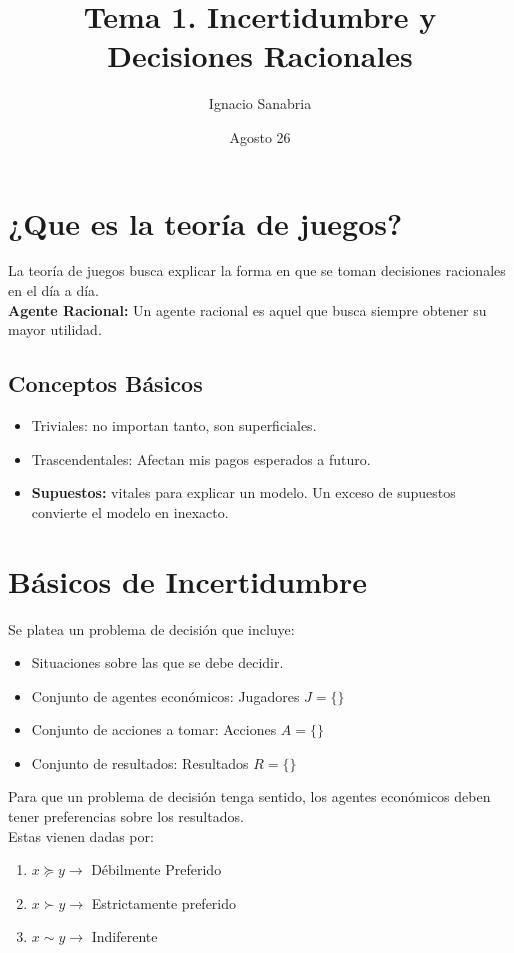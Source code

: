 \documentclass[12pt]{article}
\title{Tema 1. Incertidumbre y Decisiones Racionales}
\author{Ignacio Sanabria}
\date{Agosto 26}
\begin{document}
\maketitle

\section{¿Que es la teoría de juegos?}
La teoría de juegos busca explicar la forma en que se toman decisiones racionales en el día a día. \\
\textbf{Agente Racional:} Un agente racional es aquel que busca siempre obtener su mayor utilidad. \\
\subsection{Conceptos Básicos}
\begin{itemize}
    \item Triviales: no importan tanto, son superficiales.
    \item Trascendentales: Afectan mis pagos esperados a futuro. 
    \item \textbf{Supuestos:} vitales para explicar un modelo. Un exceso de supuestos convierte el modelo en inexacto. 
\end{itemize}

\section{Básicos de Incertidumbre}
Se platea un problema de decisión que incluye: 
\begin{itemize}
    \item Situaciones sobre las que se debe decidir. 
    \item Conjunto de agentes económicos: Jugadores $J=\{\}$
    \item Conjunto de acciones a tomar: Acciones $A=\{\}$
    \item Conjunto de resultados: Resultados $R=\{\}$
\end{itemize}
Para que un problema de decisión tenga sentido, los agentes económicos deben tener preferencias sobre los resultados. \\
Estas vienen dadas por: 
\begin{enumerate}
    \item $x\succeq y \xrightarrow{}$ Débilmente Preferido 
    \item $x\succ y \xrightarrow{}$ Estrictamente preferido
    \item $x\sim y \xrightarrow{}$ Indiferente
\end{enumerate}
\end{document}
